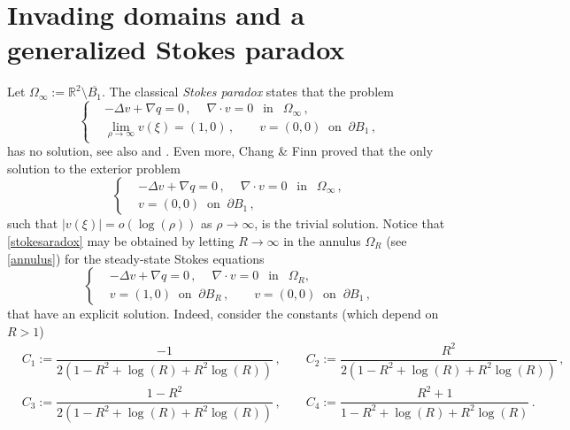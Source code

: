 \documentclass[a4paper,11pt]{article}
\numberwithin{equation}{section}
\numberwithin{figure}{section}
\begin{document}
\section{Invading domains and a generalized Stokes paradox}\label{stokesparadox}
Let $\Omega_{\infty} := \mathbb{R}^2 \setminus \overline{B_1}$. The classical \textit{Stokes paradox} \cite{stokes1851effect} states that
the problem
\begin{equation}\label{stokesaradox}
	\left\{
	\begin{aligned}
		& -\Delta v+\nabla q=0 \, ,\ \quad  \nabla\cdot v=0 \ \ \mbox{ in } \ \ \Omega_{\infty} \, , \\[3pt]
		& \lim\limits_{\rho\to \infty} v(\xi) = (1,0) \, , \qquad v = (0,0) \ \text{ on } \ \partial B_{1} \, ,
	\end{aligned}
	\right.
\end{equation}
has no solution, see also \cite[Chapter V]{galdi2011introduction} and \cite{korobkov2023stationary}. Even more, Chang \& Finn
\cite{chang1961solutions} proved that the only solution to the exterior problem
\begin{equation}\label{stokesext}
	\left\{
	\begin{aligned}
		& -\Delta v+\nabla q=0 \, ,\ \quad  \nabla\cdot v=0 \ \ \mbox{ in } \ \ \Omega_{\infty} \, , \\[3pt]
		& v = (0,0) \ \text{ on } \ \partial B_{1} \, ,
	\end{aligned}
	\right.
\end{equation}
such that $|v(\xi)| = o(\log(\rho))$ as $\rho \to \infty$, is the trivial solution. Notice that \eqref{stokesaradox} may be obtained by
letting $R\to\infty$ in the annulus $\Omega_R$ (see \eqref{annulus}) for the steady-state Stokes equations
\begin{equation}\label{stokes0}
	\left\{
	\begin{aligned}
		& -\Delta v+\nabla q=0 \, ,\ \quad  \nabla\cdot v=0 \ \ \mbox{ in } \ \ \Omega_{R}, \\[3pt]
		& v = (1,0) \ \text{ on } \ \partial B_R \, , \qquad v = (0,0) \ \text{ on } \ \partial B_{1} \, ,
	\end{aligned}
	\right.
\end{equation}
that have an explicit solution. Indeed, consider the constants (which depend on $R>1$)
\begin{equation} \label{constantes}
	\begin{aligned}
		& C_1 := \dfrac{-1}{2(1-R^2 + \log(R) + R^2 \log(R))} \, , \qquad C_2 := \dfrac{R^2}{2(1-R^2 + \log(R) + R^2 \log(R))} \, ,\\[6pt]
		& C_3 := \dfrac{1-R^2}{2(1-R^2 + \log(R) + R^2 \log(R))} \, ,\qquad C_4 := \dfrac{R^2 + 1}{1-R^2 + \log(R) + R^2 \log(R)}\, .
	\end{aligned}
\end{equation}
\end{document}
